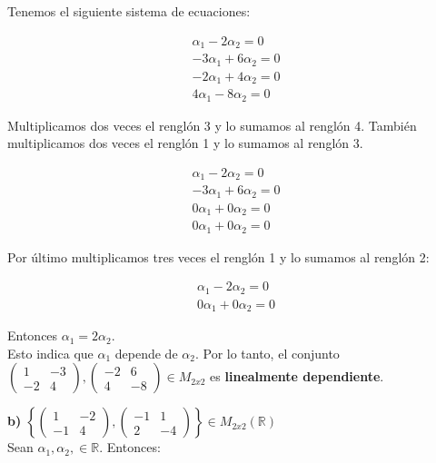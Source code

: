 \documentclass[letterpaper]{article}
\renewcommand{\*}{\cdot}
\theoremstyle{definition}
\begin{document}
Tenemos el siguiente sistema de ecuaciones:
\begin{center}
\begin{align*}
	\alpha_{1}-2\alpha_{2} = 0\\
	-3\alpha_{1} + 6\alpha_{2} = 0\\
	-2\alpha_{1}+4\alpha_{2}= 0\\
	4\alpha_{1}-8\alpha_{2}= 0
\end{align*}
\end{center}
Multiplicamos dos veces el renglón 3 y lo sumamos al renglón 4. También multiplicamos dos veces el renglón 1 y lo sumamos al renglón 3.
\begin{center}
\begin{align*}	
	\alpha_{1}-2\alpha_{2} = 0\\
	-3\alpha_{1}+6\alpha_{2}= 0\\
	0\alpha_{1}+0\alpha_{2}=0\\
	0\alpha_{1}+0\alpha_{2}= 0
\end{align*}
\end{center}
Por último multiplicamos tres veces el renglón 1 y lo sumamos al renglón 2:
\begin{center}
\begin{align*}
	\alpha_{1}-2\alpha_{2}=0\\
	0\alpha_{1}+0\alpha_{2}=0
\end{align*}	
\end{center}
Entonces $\alpha_{1}=2\alpha_{2}$.\\ Esto indica que $\alpha_{1}$ depende de $\alpha_{2}$. Por lo tanto, el conjunto  $\begin{pmatrix} 1 & -3 \\ -2 & 4 \end{pmatrix} , \begin{pmatrix} -2 & 6 \\ 4 & -8 \end{pmatrix}\in M_{2x2}$  es \textbf{linealmente dependiente}.

\textbf{b)} $\left \lbrace \begin{pmatrix} 1 & -2 \\ -1 & 4 \end{pmatrix} ,\begin{pmatrix} -1 & 1 \\ 2 & -4 \end{pmatrix}  \right \rbrace \in M_{2x2}(\mathbb{R})$\\

Sean $\alpha _1, \alpha _2, \in \mathbb{R}$. Entonces:\\
\end{document}
